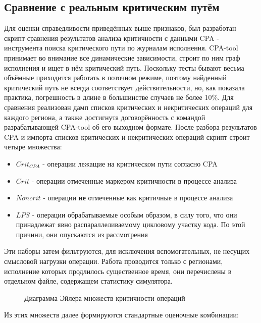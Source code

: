 \documentclass[a4paper,12pt,titlepage]{article}
\begin{document}
\subsection{Сравнение с реальным критическим путём}
\label{chap:CPAcomparison}
Для оценки справедливости приведённых выше признаков, был разработан скрипт сравнения результатов анализа критичности с данными CPA - инструмента поиска критического пути по журналам исполнения. CPA-tool принимает во внимание все динамические зависимости, строит по ним граф исполнения и ищет в нём критический путь. Поскольку тесты бывают весьма объёмные приходится работать в поточном режиме, поэтому найденный критический путь не всегда соответствует действительности, но, как показала практика, погрешность в длине в большинстве случаев не более 10\%.
Для сравнения реализован дамп списков критических и некритических операций для каждого региона, а также достигнута договорённость с командой разрабатывающей CPA-tool об его выходном формате. После разбора результатов CPA и импорта списков критических и некритических операций скрипт строит четыре множества:
\begin{itemize}
 \item $Crit_{CPA}$ - операции лежащие на критическом пути согласно CPA
 \item $Crit$ - операции отмеченные маркером критичности в процессе анализа
 \item $Noncrit$ - операции \textbf{не} отмеченные как критичные в процессе анализа
 \item $LPS$ - операции обрабатываемые особым образом, в силу того, что они принадлежат явно распараллеливаемому цикловому участку кода. По этой причини, они опускаются из рассмотрения
\end{itemize}
Эти наборы затем фильтруются, для исключения вспомогательных, не несущих смысловой нагрузки операции. Работа проводится только с регионами, исполнение которых продлилось существенное время, они перечислены в отдельном файле, содержащем статистику симулятора.
\begin{figure}[h]
\centering

\caption{Диаграмма Эйлера множеств критичности операций}
\label{fig:critical-sets}
\end{figure}
Из этих множеств далее формируются стандартные оценочные комбинации\cite{inforetreive}:
\end{document}
